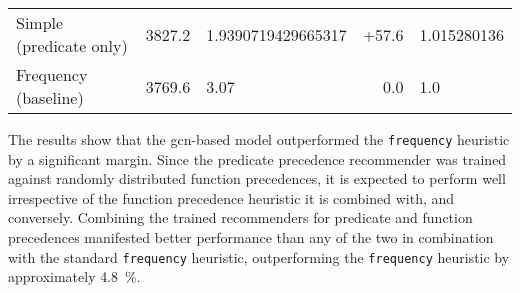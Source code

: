 \begin{table*}[ht]
\begin{tabular}{l|ll|rl}
Simple (predicate only) &
\num{3827.2} &
\num[round-mode=places,round-precision=2]{1.9390719429665317} &
+57.6 &
\num[round-mode=places,round-precision=3]{1.015280136} \\




Frequency (baseline) &
\num{3769.6} &
\num{3.07} &
0.0 &
\num[round-mode=places,round-precision=3]{1.0} \\

\end{tabular}
\end{table*}


The results show that the \gls{gcn}-based model outperformed the \texttt{frequency} heuristic by a significant margin.
Since the predicate precedence recommender was trained against randomly distributed function precedences,
it is expected to perform well irrespective of the function precedence heuristic it is combined with, and conversely.
Combining the trained recommenders for predicate and function precedences manifested better performance
than any of the two in combination with the standard \texttt{frequency} heuristic,
outperforming the \texttt{frequency} heuristic by approximately \SI{4.8}{\percent}.

